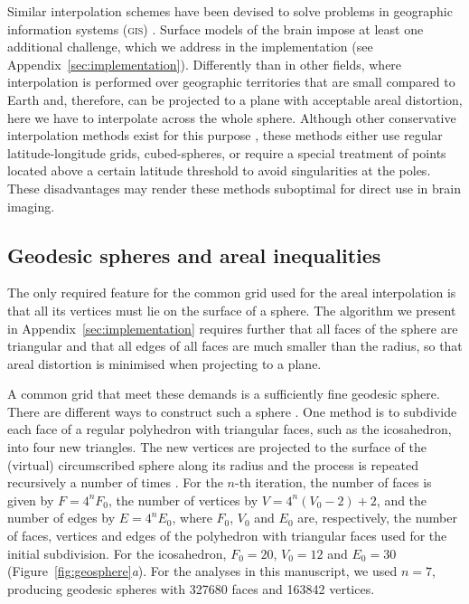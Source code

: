 Similar interpolation schemes have been devised to solve problems in geographic information systems (\textsc{gis}) \citep{Markoff1973, Goodchild1980, Flowerdew1991, Gregory2010}. Surface models of the brain impose at least one additional challenge, which we address in the implementation (see Appendix~\ref{sec:implementation}). Differently than in other fields, where interpolation is performed over geographic territories that are small compared to Earth and, therefore, can be projected to a plane with acceptable areal distortion, here we have to interpolate across the whole sphere. Although other conservative interpolation methods exist for this purpose \citep{Jones1999, Lauritzen2008, Ullrich2009}, these methods either use regular latitude-longitude grids, cubed-spheres, or require a special treatment of points located above a certain latitude threshold to avoid singularities at the poles. These disadvantages may render these methods suboptimal for direct use in brain imaging.

\subsection{Geodesic spheres and areal inequalities}
\label{sec:geosphere}

The only required feature for the common grid used for the areal interpolation is that all its vertices must lie on the surface of a sphere. The algorithm we present in Appendix~\ref{sec:implementation} requires further that all faces of the sphere are triangular and that all edges of all faces are much smaller than the radius, so that areal distortion is minimised when projecting to a plane.

A common grid that meet these demands is a sufficiently fine geodesic sphere. There are different ways to construct such a sphere \citep{Kenner1976}. One method is to subdivide each face of a regular polyhedron with triangular faces, such as the icosahedron, into four new triangles. The new vertices are projected to the surface of the (virtual) circumscribed sphere along its radius and the process is repeated recursively a number of times \citep{Lauchner1969}. For the $n$-th iteration, the number of faces is given by $F=4^nF_0$, the number of vertices by $V=4^n(V_0-2)+2$, and the number of edges by $E=4^nE_0$, where $F_0$, $V_0$ and $E_0$ are, respectively, the number of faces, vertices and edges of the polyhedron with triangular faces used for the initial subdivision. For the icosahedron, $F_0=20$, $V_0=12$ and $E_0=30$ (Figure~\ref{fig:geosphere}\emph{a}). For the analyses in this manuscript, we used $n=7$, producing geodesic spheres with 327680 faces and 163842 vertices.

